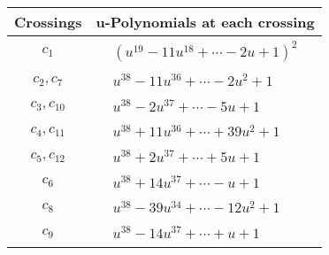 \documentclass[1p]{elsarticle_modified}
\theoremstyle{definition}
\begin{document}
\begin{tabular}{m{50pt}|m{274pt}}
Crossings & \hspace{64pt}u-Polynomials at each crossing \\
\hline $$\begin{aligned}c_{1}\end{aligned}$$&$\begin{aligned}
&(u^{19}-11 u^{18}+\cdots-2 u+1)^{2}
\end{aligned}$\\
\hline $$\begin{aligned}c_{2},c_{7}\end{aligned}$$&$\begin{aligned}
&u^{38}-11 u^{36}+\cdots-2 u^2+1
\end{aligned}$\\
\hline $$\begin{aligned}c_{3},c_{10}\end{aligned}$$&$\begin{aligned}
&u^{38}-2 u^{37}+\cdots-5 u+1
\end{aligned}$\\
\hline $$\begin{aligned}c_{4},c_{11}\end{aligned}$$&$\begin{aligned}
&u^{38}+11 u^{36}+\cdots+39 u^2+1
\end{aligned}$\\
\hline $$\begin{aligned}c_{5},c_{12}\end{aligned}$$&$\begin{aligned}
&u^{38}+2 u^{37}+\cdots+5 u+1
\end{aligned}$\\
\hline $$\begin{aligned}c_{6}\end{aligned}$$&$\begin{aligned}
&u^{38}+14 u^{37}+\cdots- u+1
\end{aligned}$\\
\hline $$\begin{aligned}c_{8}\end{aligned}$$&$\begin{aligned}
&u^{38}-39 u^{34}+\cdots-12 u^2+1
\end{aligned}$\\
\hline $$\begin{aligned}c_{9}\end{aligned}$$&$\begin{aligned}
&u^{38}-14 u^{37}+\cdots+u+1
\end{aligned}$\\
\hline
\end{tabular}\\~\\
\end{document}
